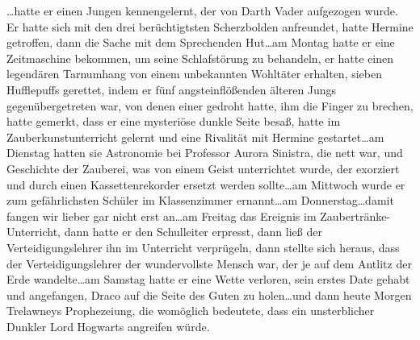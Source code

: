 …hatte er einen Jungen kennengelernt, der von Darth Vader aufgezogen wurde. Er hatte sich mit den drei berüchtigtsten Scherzbolden anfreundet, hatte Hermine getroffen, dann die Sache mit dem Sprechenden Hut…am Montag hatte er eine Zeitmaschine bekommen, um seine Schlafstörung zu behandeln, er hatte einen legendären Tarnumhang von einem unbekannten Wohltäter erhalten, sieben Hufflepuffs gerettet, indem er fünf angsteinflößenden älteren Jungs gegenübergetreten war, von denen einer gedroht hatte, ihm die Finger zu brechen, hatte gemerkt, dass er eine mysteriöse dunkle Seite besaß, hatte im Zauberkunstunterricht  gelernt und eine Rivalität mit Hermine gestartet…am Dienstag hatten sie Astronomie bei Professor Aurora Sinistra, die nett war, und Geschichte der Zauberei, was von einem Geist unterrichtet wurde, der exorziert und durch einen Kassettenrekorder ersetzt werden sollte…am Mittwoch wurde er zum gefährlichsten Schüler im Klassenzimmer ernannt…am Donnerstag…damit fangen wir lieber gar nicht erst an…am Freitag das Ereignis im Zaubertränke-Unterricht, dann hatte er den Schulleiter erpresst, dann ließ der Verteidigungslehrer ihn im Unterricht verprügeln, dann stellte sich heraus, dass der Verteidigungslehrer der wundervollste Mensch war, der je auf dem Antlitz der Erde wandelte…am Samstag hatte er eine Wette verloren, sein erstes Date gehabt und angefangen, Draco auf die Seite des Guten zu holen…und dann heute Morgen Trelawneys Prophezeiung, die womöglich bedeutete, dass ein unsterblicher Dunkler Lord Hogwarts angreifen würde.

